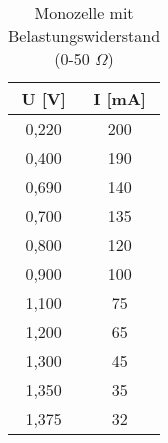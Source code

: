 \begin{table}[h]
	\begin{center}
		\begin{tabular}{cc}
			U [V]&I [mA] \\ \hline
			0,220&200\\
			0,400&190\\
			0,690&140\\
			0,700&135\\
			0,800&120\\
			0,900&100\\
			1,100&75\\
			1,200&65\\
			1,300&45\\
			1,350&35\\
			1,375&32
		\end{tabular}
		\caption{Monozelle mit Belastungswiderstand (0-50 $\Omega$)}
		\label{tabb}
	\end{center}
\end{table}